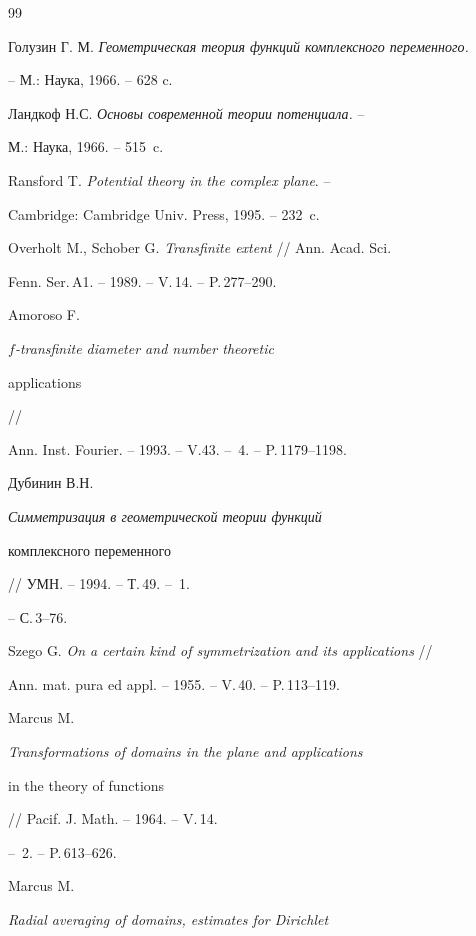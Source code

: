 \begin{thebibliography}{99}







Голузин Г. М. {\it Геометрическая теория функций комплексного переменного.} 


-- М.: Наука, 1966. -- 628 c.




Ландкоф Н.С. {\it Основы современной теории потенциала.} --


М.: Наука, 1966. -- 515~c.




Ransford T. {\it Potential theory in the complex plane}. --


Cambridge: Cambridge Univ. Press, 1995. -- 232~c. 




Overholt M., Schober G. {\it Transfinite extent} // Ann. Acad. Sci.


Fenn. Ser.\,A1. -- 1989. -- V.\,14. -- P.\,277--290.




Amoroso F. {\it $f$-transfinite diameter and number theoretic


applications} //


Ann. Inst. Fourier. -- 1993. -- V.43. -- \No\,4. -- P.\,1179--1198.




Дубинин В.Н. {\it Симметризация в геометрической теории функций


комплексного переменного} // УМН. -- 1994. -- Т.\,49. -- \No\,1.


-- С.\,3--76.




Szego G. {\it On a certain kind of symmetrization and its applications} //


Ann. mat. pura ed appl. -- 1955. -- V.\,40. -- P.\,113--119.




Marcus M. {\it Transformations of domains in the plane and applications


in the theory of functions} // Pacif. J. Math. -- 1964. -- V.\,14.


-- \No\,2. -- P.\,613--626.




Marcus M. {\it Radial averaging of domains, estimates for Dirichlet


}
\end{thebibliography}
